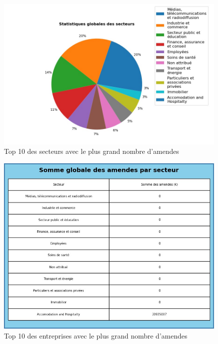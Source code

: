 \documentclass[french]{article}
\begin{document}
\newpage

	\begin{multicols}{2}
	\begin{figure}
		[H]\centering\includegraphics[width=1.0\linewidth]{graphs/sector_data}
		\caption{Top 10 des secteurs avec le plus grand nombre d'amendes}
	\end{figure}
	\begin{figure}
		[H]\centering\includegraphics[width=1\linewidth]{graphs/sector_data_fines}
		\caption{Top 10 des entreprises avec le plus grand nombre d'amendes}
	 \end{figure}
	
	\end{multicols}
	
	
	
\end{document}
